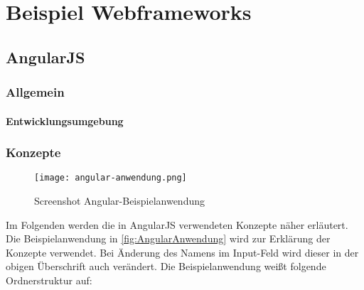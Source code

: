 
\chapter{Beispiel Webframeworks}

\section{AngularJS}

\subsection{Allgemein}

\subsubsection{}


\subsubsection{Entwicklungsumgebung}


\subsection{Konzepte}

\begin{figure}
	\centering
	\texttt{[image: angular-anwendung.png]}
	\caption{Screenshot Angular-Beispielanwendung} 
	\label{fig:AngularAnwendung}
\end{figure}

Im Folgenden werden die in AngularJS verwendeten Konzepte näher erläutert. Die Beispielanwendung in \autoref{fig:AngularAnwendung} wird zur Erklärung der Konzepte verwendet. Bei Änderung des Namens im Input-Feld wird dieser in der obigen Überschrift auch verändert. Die Beispielanwendung weißt folgende Ordnerstruktur auf:

